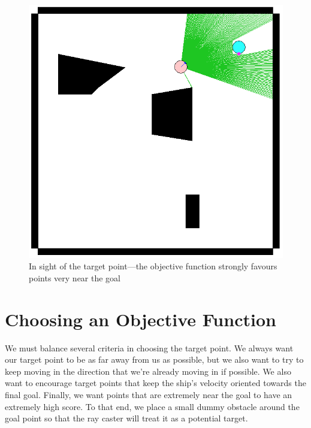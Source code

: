 \documentclass{report}
\begin{document}
\begin{figure}
\begin{minipage}{\linewidth}
\begin{minipage}[t]{0.45\linewidth}
    \includegraphics[width=\linewidth]{ray4.png}
    \captionsetup{singlelinecheck=off}
    \caption[.]{\label{fig:ray4} In sight of the target point---the objective function strongly
        favours points very near the goal}
\end{minipage}
\end{minipage}
\end{figure}

\section{Choosing an Objective Function}
We must balance several criteria in choosing the target point. We always want our target
point to be as far away from us as possible, but we also want to try to keep moving in the direction that we're already
moving in if possible. We also want to encourage target points that keep the ship's velocity oriented towards the
final goal. Finally, we want points that are extremely near the goal to have an extremely high score.
To that end, we place a small dummy obstacle around the goal point so that the ray caster will treat it as a potential
target.
\end{document}
